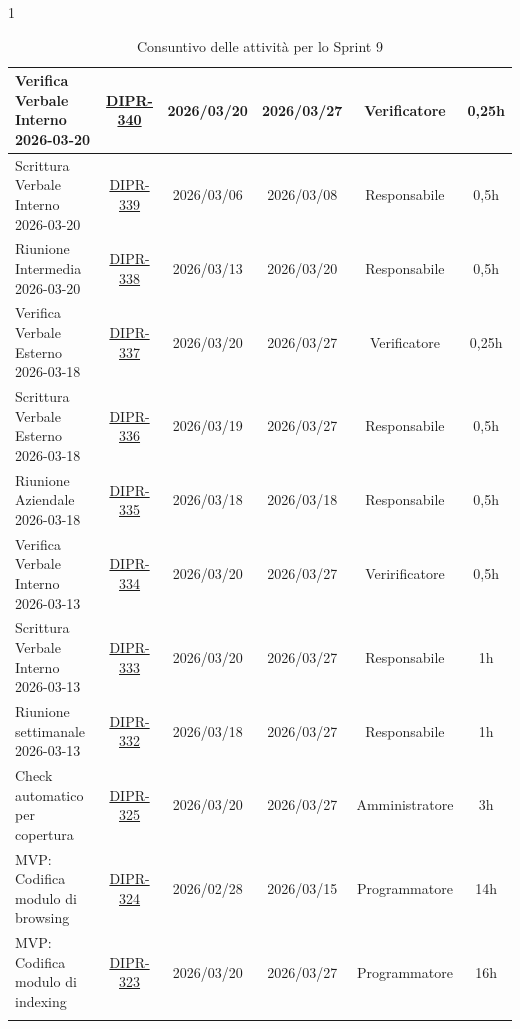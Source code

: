 \documentclass[a4paper,12pt]{article}
\begin{document}
\begin{spacing}{1}
\begin{longtable}{|p{4cm}|c|c|c|c|c|}
        \hline
        Verifica Verbale Interno 2026-03-20 & \href{https://7zpus.atlassian.net/browse/DIPR-340}{DIPR-340} & 2026/03/20 & 2026/03/27 & Verificatore & 0,25h \\
        \hline
        Scrittura Verbale Interno 2026-03-20 & \href{https://7zpus.atlassian.net/browse/DIPR-339}{DIPR-339} & 2026/03/06 & 2026/03/08 & Responsabile & 0,5h \\
        \hline
        Riunione Intermedia 2026-03-20 & \href{https://7zpus.atlassian.net/browse/DIPR-338}{DIPR-338} & 2026/03/13 & 2026/03/20 & Responsabile & 0,5h \\
        \hline
        Verifica Verbale Esterno 2026-03-18 & \href{https://7zpus.atlassian.net/browse/DIPR-337}{DIPR-337} & 2026/03/20 & 2026/03/27 & Verificatore & 0,25h \\
        \hline
        Scrittura Verbale Esterno 2026-03-18 & \href{https://7zpus.atlassian.net/browse/DIPR-336}{DIPR-336} & 2026/03/19 & 2026/03/27 & Responsabile & 0,5h \\
        \hline
        Riunione Aziendale 2026-03-18 & \href{https://7zpus.atlassian.net/browse/DIPR-335}{DIPR-335} & 2026/03/18 & 2026/03/18 & Responsabile & 0,5h \\
        \hline
        Verifica Verbale Interno 2026-03-13 & \href{https://7zpus.atlassian.net/browse/DIPR-334}{DIPR-334} & 2026/03/20 & 2026/03/27 & Veririficatore & 0,5h \\
        \hline
        Scrittura Verbale Interno 2026-03-13 & \href{https://7zpus.atlassian.net/browse/DIPR-333}{DIPR-333} & 2026/03/20 & 2026/03/27 & Responsabile & 1h \\
        \hline
        Riunione settimanale 2026-03-13 & \href{https://7zpus.atlassian.net/browse/DIPR-332}{DIPR-332} & 2026/03/18 & 2026/03/27 & Responsabile & 1h \\
        \hline
        Check automatico per copertura & \href{https://7zpus.atlassian.net/browse/DIPR-325}{DIPR-325} & 2026/03/20 & 2026/03/27 & Amministratore & 3h \\
        \hline
        [BACKEND] MVP: Codifica modulo di browsing & \href{https://7zpus.atlassian.net/browse/DIPR-324}{DIPR-324} & 2026/02/28 & 2026/03/15 & Programmatore & 14h \\
        \hline
        [BACKEND] MVP: Codifica modulo di indexing & \href{https://7zpus.atlassian.net/browse/DIPR-323}{DIPR-323} & 2026/03/20 & 2026/03/27 & Programmatore & 16h \\
        \hline
        \rowcolor{white}
        \caption{Consuntivo delle attività per lo Sprint 9}
    \end{longtable}
    \end{spacing}
\end{document}
